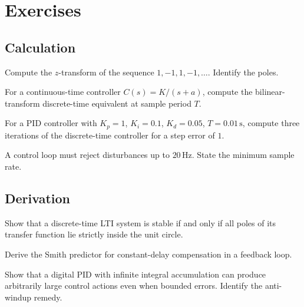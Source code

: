 \section{Exercises}

\subsection*{Calculation}

\begin{exercise}
Compute the $z$-transform of the sequence $1, -1, 1, -1, \ldots$. Identify the poles.
\end{exercise}

\begin{exercise}
For a continuous-time controller $C(s) = K/(s + a)$, compute the bilinear-transform discrete-time equivalent at sample period $T$.
\end{exercise}

\begin{exercise}
For a PID controller with $K_p = 1$, $K_i = 0.1$, $K_d = 0.05$, $T = 0.01\,\si{\second}$, compute three iterations of the discrete-time controller for a step error of $1$.
\end{exercise}

\begin{exercise}
A control loop must reject disturbances up to $20\,\si{\hertz}$. State the minimum sample rate.
\end{exercise}

\subsection*{Derivation}

\begin{exercise}
Show that a discrete-time LTI system is stable if and only if all poles of its transfer function lie strictly inside the unit circle.
\end{exercise}

\begin{exercise}
Derive the Smith predictor for constant-delay compensation in a feedback loop.
\end{exercise}

\begin{exercise}
Show that a digital PID with infinite integral accumulation can produce arbitrarily large control actions even when bounded errors. Identify the anti-windup remedy.
\end{exercise}

